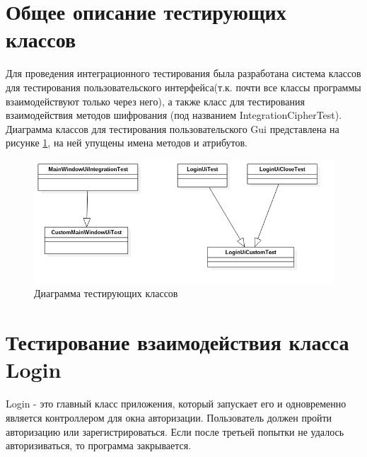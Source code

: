 \documentclass[a4paper,12pt]{article}
\begin{document}
\newpage\section{Общее описание тестирующих классов}
Для проведения интеграционного тестирования была разработана система классов для тестирования пользовательского интерфейса(т.к. почти все классы программы взаимодействуют только через него), а также класс для тестирования взаимодействия методов шифрования (под названием IntegrationCipherTest). Диаграмма классов для тестирования пользовательского Gui представлена на рисунке \ref{fig:class_diagram_test_gui}, на ней упущены имена методов и атрибутов.
\begin{center}
	\begin{figure}[h!]
		\centering
   		\includegraphics[scale=0.6]{img/class_diagram_testing.png}
   		\caption{Диаграмма тестирующих классов}
   		\label{fig:class_diagram_test_gui}
    \end{figure}
\end{center}


\newpage\section{Тестирование взаимодействия класса Login}
Login - это главный класс приложения, который запускает его и одновременно является контроллером для окна авторизации. Пользователь должен пройти авторизацию или зарегистрироваться. Если после третьей попытки не удалось авторизиваться, то программа закрывается.
\end{document}
